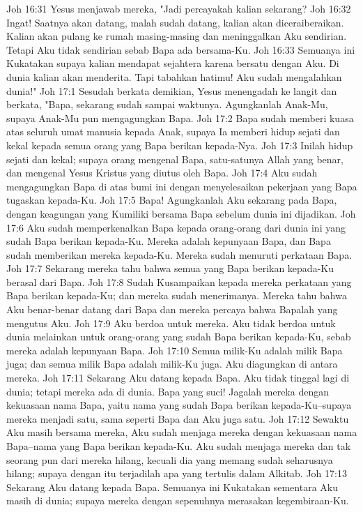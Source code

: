 Joh 16:31  Yesus menjawab mereka, "Jadi percayakah kalian sekarang?
Joh 16:32  Ingat! Saatnya akan datang, malah sudah datang, kalian akan diceraiberaikan. Kalian akan pulang ke rumah masing-masing dan meninggalkan Aku sendirian. Tetapi Aku tidak sendirian sebab Bapa ada bersama-Ku.
Joh 16:33  Semuanya ini Kukatakan supaya kalian mendapat sejahtera karena bersatu dengan Aku. Di dunia kalian akan menderita. Tapi tabahkan hatimu! Aku sudah mengalahkan dunia!"
Joh 17:1  Sesudah berkata demikian, Yesus menengadah ke langit dan berkata, "Bapa, sekarang sudah sampai waktunya. Agungkanlah Anak-Mu, supaya Anak-Mu pun mengagungkan Bapa.
Joh 17:2  Bapa sudah memberi kuasa atas seluruh umat manusia kepada Anak, supaya Ia memberi hidup sejati dan kekal kepada semua orang yang Bapa berikan kepada-Nya.
Joh 17:3  Inilah hidup sejati dan kekal; supaya orang mengenal Bapa, satu-satunya Allah yang benar, dan mengenal Yesus Kristus yang diutus oleh Bapa.
Joh 17:4  Aku sudah mengagungkan Bapa di atas bumi ini dengan menyelesaikan pekerjaan yang Bapa tugaskan kepada-Ku.
Joh 17:5  Bapa! Agungkanlah Aku sekarang pada Bapa, dengan keagungan yang Kumiliki bersama Bapa sebelum dunia ini dijadikan.
Joh 17:6  Aku sudah memperkenalkan Bapa kepada orang-orang dari dunia ini yang sudah Bapa berikan kepada-Ku. Mereka adalah kepunyaan Bapa, dan Bapa sudah memberikan mereka kepada-Ku. Mereka sudah menuruti perkataan Bapa.
Joh 17:7  Sekarang mereka tahu bahwa semua yang Bapa berikan kepada-Ku berasal dari Bapa.
Joh 17:8  Sudah Kusampaikan kepada mereka perkataan yang Bapa berikan kepada-Ku; dan mereka sudah menerimanya. Mereka tahu bahwa Aku benar-benar datang dari Bapa dan mereka percaya bahwa Bapalah yang mengutus Aku.
Joh 17:9  Aku berdoa untuk mereka. Aku tidak berdoa untuk dunia melainkan untuk orang-orang yang sudah Bapa berikan kepada-Ku, sebab mereka adalah kepunyaan Bapa.
Joh 17:10  Semua milik-Ku adalah milik Bapa juga; dan semua milik Bapa adalah milik-Ku juga. Aku diagungkan di antara mereka.
Joh 17:11  Sekarang Aku datang kepada Bapa. Aku tidak tinggal lagi di dunia; tetapi mereka ada di dunia. Bapa yang suci! Jagalah mereka dengan kekuasaan nama Bapa, yaitu nama yang sudah Bapa berikan kepada-Ku--supaya mereka menjadi satu, sama seperti Bapa dan Aku juga satu.
Joh 17:12  Sewaktu Aku masih bersama mereka, Aku sudah menjaga mereka dengan kekuasaan nama Bapa--nama yang Bapa berikan kepada-Ku. Aku sudah menjaga mereka dan tak seorang pun dari mereka hilang, kecuali dia yang memang sudah seharusnya hilang; supaya dengan itu terjadilah apa yang tertulis dalam Alkitab.
Joh 17:13  Sekarang Aku datang kepada Bapa. Semuanya ini Kukatakan sementara Aku masih di dunia; supaya mereka dengan sepenuhnya merasakan kegembiraan-Ku.
